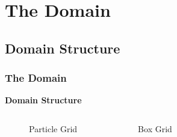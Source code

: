 \section{The Domain}
\subsection{Domain Structure}
\begin{frame}
    \frametitle{The Domain}
    \textbf{Domain Structure}
    \smallskip
    \begin{columns}
        \begin{figure}[h]
            \resizebox{.9\textwidth}{!}{%
                
            }
            \caption{Particle Grid}
        \end{figure}

        \begin{figure}[h]
            \resizebox{.9\textwidth}{!}{%
                
            }
            \caption{Box Grid}
        \end{figure}
    \end{columns}
\end{frame}

